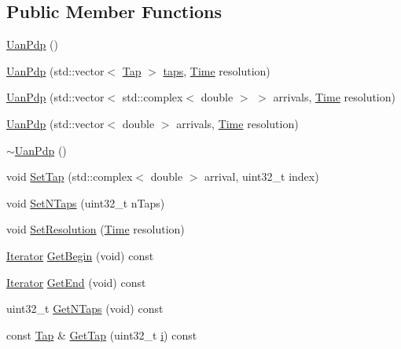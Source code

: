 \subsection*{Public Member Functions}
\begin{DoxyCompactItemize}
\item 
\hyperlink{classns3_1_1UanPdp_a89d7f0413f3eb5e5636e813862e0c151}{Uan\+Pdp} ()
\item 
\hyperlink{classns3_1_1UanPdp_ad2f8e440cfe5c3ea2e9ce884aa3a3bb3}{Uan\+Pdp} (std\+::vector$<$ \hyperlink{classns3_1_1Tap}{Tap} $>$ \hyperlink{mmwave_2model_2fading-traces_2fading__trace__generator_8m_a36e13439e5ec878d93e3b760df348959}{taps}, \hyperlink{classns3_1_1Time}{Time} resolution)
\item 
\hyperlink{classns3_1_1UanPdp_a5fb554201124acb05aaa4a62a029a12b}{Uan\+Pdp} (std\+::vector$<$ std\+::complex$<$ double $>$ $>$ arrivals, \hyperlink{classns3_1_1Time}{Time} resolution)
\item 
\hyperlink{classns3_1_1UanPdp_aa237f205d14e548955c765647dd8bdcd}{Uan\+Pdp} (std\+::vector$<$ double $>$ arrivals, \hyperlink{classns3_1_1Time}{Time} resolution)
\item 
\hyperlink{classns3_1_1UanPdp_af997b7a1301486f15ddad79e83075e0d}{$\sim$\+Uan\+Pdp} ()
\item 
void \hyperlink{classns3_1_1UanPdp_a44179cc7db325ddda51a8cc92b20f1a1}{Set\+Tap} (std\+::complex$<$ double $>$ arrival, uint32\+\_\+t index)
\item 
void \hyperlink{classns3_1_1UanPdp_a7bad04e26cb6b2441fc9a08834a6ece1}{Set\+N\+Taps} (uint32\+\_\+t n\+Taps)
\item 
void \hyperlink{classns3_1_1UanPdp_a32b9184bd5edae0925c8b8b58828d767}{Set\+Resolution} (\hyperlink{classns3_1_1Time}{Time} resolution)
\item 
\hyperlink{classns3_1_1UanPdp_a640e546e31696f75f9e638513b38ceba}{Iterator} \hyperlink{classns3_1_1UanPdp_ae04bccfb927ff34a6a5744a4c5b29d79}{Get\+Begin} (void) const 
\item 
\hyperlink{classns3_1_1UanPdp_a640e546e31696f75f9e638513b38ceba}{Iterator} \hyperlink{classns3_1_1UanPdp_a6b003bd8a0d22185ce8f5652324db296}{Get\+End} (void) const 
\item 
uint32\+\_\+t \hyperlink{classns3_1_1UanPdp_a2c8f126c0e33815d19505b55381f40f8}{Get\+N\+Taps} (void) const 
\item 
const \hyperlink{classns3_1_1Tap}{Tap} \& \hyperlink{classns3_1_1UanPdp_acc23ec589977ff83103af6ae417af95d}{Get\+Tap} (uint32\+\_\+t \hyperlink{lte__uplink__power__control_8m_a6f6ccfcf58b31cb6412107d9d5281426}{i}) const 

\end{DoxyCompactItemize}
